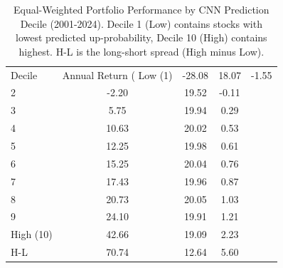 \begin{table}
\caption{Equal-Weighted Portfolio Performance by CNN Prediction Decile (2001-2024). Decile 1 (Low) contains stocks with lowest predicted up-probability, Decile 10 (High) contains highest. H-L is the long-short spread (High minus Low).}
\label{tab:portfolio_ew}
\begin{tabular}{lccc}
\toprule
Decile & Annual Return (%
\midrule
Low (1) & -28.08 & 18.07 & -1.55 \\
2 & -2.20 & 19.52 & -0.11 \\
3 & 5.75 & 19.94 & 0.29 \\
4 & 10.63 & 20.02 & 0.53 \\
5 & 12.25 & 19.98 & 0.61 \\
6 & 15.25 & 20.04 & 0.76 \\
7 & 17.43 & 19.96 & 0.87 \\
8 & 20.73 & 20.05 & 1.03 \\
9 & 24.10 & 19.91 & 1.21 \\
High (10) & 42.66 & 19.09 & 2.23 \\
H-L & 70.74 & 12.64 & 5.60 \\
\bottomrule
\end{tabular}
\end{table}
